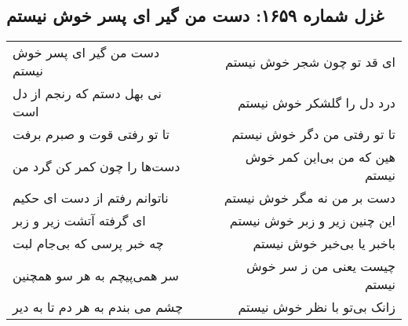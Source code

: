 \begin{center}
\section*{غزل شماره ۱۶۵۹: دست من گیر ای پسر خوش نیستم}
\label{sec:1659}
\begin{longtable}{l p{0.5cm} r}
دست من گیر ای پسر خوش نیستم
&&
ای قد تو چون شجر خوش نیستم
\\
نی بهل دستم که رنجم از دل است
&&
درد دل را گلشکر خوش نیستم
\\
تا تو رفتی قوت و صبرم برفت
&&
تا تو رفتی من دگر خوش نیستم
\\
دست‌ها را چون کمر کن گرد من
&&
هین که من بی‌این کمر خوش نیستم
\\
ناتوانم رفتم از دست ای حکیم
&&
دست بر من نه مگر خوش نیستم
\\
ای گرفته آتشت زیر و زبر
&&
این چنین زیر و زبر خوش نیستم
\\
چه خبر پرسی که بی‌جام لبت
&&
باخبر یا بی‌خبر خوش نیستم
\\
سر همی‌پیچم به هر سو همچنین
&&
چیست یعنی من ز سر خوش نیستم
\\
چشم می بندم به هر دم تا به دیر
&&
زانک بی‌تو با نظر خوش نیستم
\\
\end{longtable}
\end{center}
